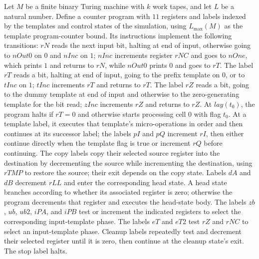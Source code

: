 \begin{definition}
\label{Complexity.UTab.prog}
\leanok
{}
Let $M$ be a finite binary Turing machine with $k$ work tapes, and let $L$ be a natural
number. Define a counter program with $11$ registers and labels indexed by the templates
and control states of the simulation, using $L_{\max}(M)$ as the template
program-counter bound. Its instructions implement the following transitions: $rN$ reads
the next input bit, halting at end of input, otherwise going to $nOut0$ on $0$ and
$nInc$ on $1$; $nInc$ increments register $rNC$ and goes to $nOne$, which prints $1$ and
returns to $rN$, while $nOut0$ prints $0$ and goes to $rT$. The label $rT$ reads a bit,
halting at end of input, going to the prefix template on $0$, or to $tInc$ on $1$;
$tInc$ increments $rT$ and returns to $rT$. The label $rZ$ reads a bit, going to the
dummy template at end of input and otherwise to the zero-generating template for the bit
read; $zInc$ increments $rZ$ and returns to $rZ$. At $lay(t_0)$, the program halts if
$rT=0$ and otherwise starts processing cell $0$ with flag $t_0$. At a template label, it
executes that template’s micro-operations in order and then continues at its successor
label; the labels $pI$ and $pQ$ increment $rI$, then either continue directly when the
template flag is true or increment $rQ$ before continuing. The copy labels copy their
selected source register into the destination by decrementing the source while
incrementing the destination, using $rTMP$ to restore the source; their exit depends on
the copy state. Labels $dA$ and $dB$ decrement $rLL$ and enter the corresponding head
state. A head state branches according to whether its associated register is zero;
otherwise the program decrements that register and executes the head-state body. The
labels $zb$, $ub$, $ub2$, $iPA$, and $iPB$ test or increment the indicated registers to
select the corresponding input-template phase. The labels $eT$ and $eT2$ test $rZ$ and
$rNC$ to select an input-template phase. Cleanup labels repeatedly test and decrement
their selected register until it is zero, then continue at the cleanup state’s exit. The
stop label halts.
\end{definition}
